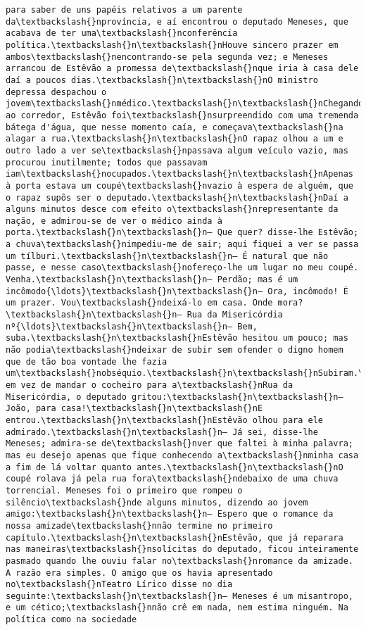 \documentclass[11pt]{article}
\begin{document}
\begin{Verbatim}[commandchars=\\\{\}]
para saber de uns papéis relativos a um parente da\textbackslash{}nprovíncia, e aí encontrou o deputado Meneses, que acabava de ter uma\textbackslash{}nconferência política.\textbackslash{}n\textbackslash{}nHouve sincero prazer em ambos\textbackslash{}nencontrando-se pela segunda vez; e Meneses arrancou de Estêvão a promessa de\textbackslash{}nque iria à casa dele daí a poucos dias.\textbackslash{}n\textbackslash{}nO ministro depressa despachou o jovem\textbackslash{}nmédico.\textbackslash{}n\textbackslash{}nChegando ao corredor, Estêvão foi\textbackslash{}nsurpreendido com uma tremenda bátega d'água, que nesse momento caía, e começava\textbackslash{}na alagar a rua.\textbackslash{}n\textbackslash{}nO rapaz olhou a um e outro lado a ver se\textbackslash{}npassava algum veículo vazio, mas procurou inutilmente; todos que passavam iam\textbackslash{}nocupados.\textbackslash{}n\textbackslash{}nApenas à porta estava um coupé\textbackslash{}nvazio à espera de alguém, que o rapaz supôs ser o deputado.\textbackslash{}n\textbackslash{}nDaí a alguns minutos desce com efeito o\textbackslash{}nrepresentante da nação, e admirou-se de ver o médico ainda à porta.\textbackslash{}n\textbackslash{}n— Que quer? disse-lhe Estêvão; a chuva\textbackslash{}nimpediu-me de sair; aqui fiquei a ver se passa um tílburi.\textbackslash{}n\textbackslash{}n— É natural que não passe, e nesse caso\textbackslash{}nofereço-lhe um lugar no meu coupé. Venha.\textbackslash{}n\textbackslash{}n— Perdão; mas é um incômodo{\ldots}\textbackslash{}n\textbackslash{}n— Ora, incômodo! É um prazer. Vou\textbackslash{}ndeixá-lo em casa. Onde mora?\textbackslash{}n\textbackslash{}n— Rua da Misericórdia nº{\ldots}\textbackslash{}n\textbackslash{}n— Bem, suba.\textbackslash{}n\textbackslash{}nEstêvão hesitou um pouco; mas não podia\textbackslash{}ndeixar de subir sem ofender o digno homem que de tão boa vontade lhe fazia um\textbackslash{}nobséquio.\textbackslash{}n\textbackslash{}nSubiram.\textbackslash{}n\textbackslash{}nMas em vez de mandar o cocheiro para a\textbackslash{}nRua da Misericórdia, o deputado gritou:\textbackslash{}n\textbackslash{}n— João, para casa!\textbackslash{}n\textbackslash{}nE entrou.\textbackslash{}n\textbackslash{}nEstêvão olhou para ele admirado.\textbackslash{}n\textbackslash{}n— Já sei, disse-lhe Meneses; admira-se de\textbackslash{}nver que faltei à minha palavra; mas eu desejo apenas que fique conhecendo a\textbackslash{}nminha casa a fim de lá voltar quanto antes.\textbackslash{}n\textbackslash{}nO coupé rolava já pela rua fora\textbackslash{}ndebaixo de uma chuva torrencial. Meneses foi o primeiro que rompeu o silêncio\textbackslash{}nde alguns minutos, dizendo ao jovem amigo:\textbackslash{}n\textbackslash{}n— Espero que o romance da nossa amizade\textbackslash{}nnão termine no primeiro capítulo.\textbackslash{}n\textbackslash{}nEstêvão, que já reparara nas maneiras\textbackslash{}nsolícitas do deputado, ficou inteiramente pasmado quando lhe ouviu falar no\textbackslash{}nromance da amizade. A razão era simples. O amigo que os havia apresentado no\textbackslash{}nTeatro Lírico disse no dia seguinte:\textbackslash{}n\textbackslash{}n— Meneses é um misantropo, e um cético;\textbackslash{}nnão crê em nada, nem estima ninguém. Na política como na sociedade 
\end{Verbatim}
\end{document}
